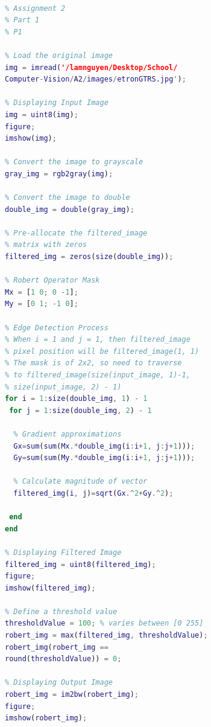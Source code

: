 \documentclass[conference]{IEEEtran}
\begin{document}
\begin{lstlisting}[language=Matlab]

% Assignment 2
% Part 1
% P1

% Load the original image
img = imread('/lamnguyen/Desktop/School/
Computer-Vision/A2/images/etronGTRS.jpg');

% Displaying Input Image
img = uint8(img);
figure; 
imshow(img); 

% Convert the image to grayscale
gray_img = rgb2gray(img);

% Convert the image to double
double_img = double(gray_img);
  
% Pre-allocate the filtered_image 
% matrix with zeros
filtered_img = zeros(size(double_img));
  
% Robert Operator Mask
Mx = [1 0; 0 -1];
My = [0 1; -1 0];
  
% Edge Detection Process
% When i = 1 and j = 1, then filtered_image 
% pixel position will be filtered_image(1, 1)
% The mask is of 2x2, so need to traverse 
% to filtered_image(size(input_image, 1)-1,
% size(input_image, 2) - 1)
for i = 1:size(double_img, 1) - 1
 for j = 1:size(double_img, 2) - 1
  
  % Gradient approximations
  Gx=sum(sum(Mx.*double_img(i:i+1, j:j+1)));
  Gy=sum(sum(My.*double_img(i:i+1, j:j+1)));
                 
  % Calculate magnitude of vector
  filtered_img(i, j)=sqrt(Gx.^2+Gy.^2);
         
 end
end

% Displaying Filtered Image
filtered_img = uint8(filtered_img);
figure;
imshow(filtered_img);
  
% Define a threshold value
thresholdValue = 100; % varies between [0 255]
robert_img = max(filtered_img, thresholdValue);
robert_img(robert_img == 
round(thresholdValue)) = 0;
  
% Displaying Output Image
robert_img = im2bw(robert_img);
figure;
imshow(robert_img); 

\end{lstlisting}
\end{document}
